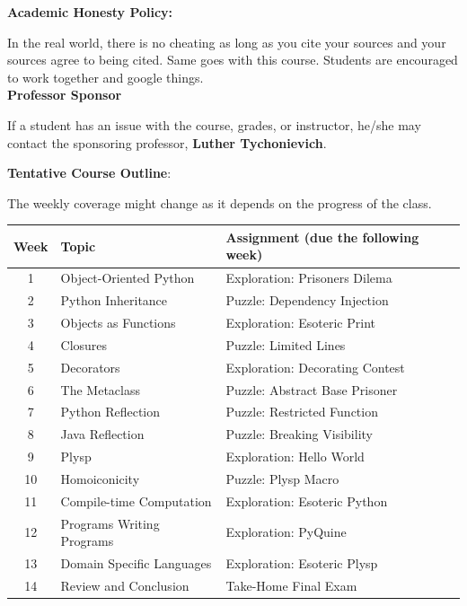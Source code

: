 \documentclass[11pt]{article}
\begin{document}
\textbf {\large Academic Honesty Policy:} 

In the real world, there is no cheating as long as you cite your sources and your sources agree to being cited. Same goes with this course. Students are encouraged to work together and google things. 
\\

\textbf {\large Professor Sponsor}

If a student has an issue with the course, grades, or instructor, he/she may contact the sponsoring professor, \textbf{Luther Tychonievich}.

\newpage
\textbf {\large Tentative Course Outline}:

The weekly coverage might change as it depends on the progress of the class. 

\begin{center}
\begin{tabular}{c | l | l}
\textbf{Week} & \textbf{Topic} & \textbf{Assignment} (due the following week)  \\
\hline 1 & Object-Oriented Python  & Exploration: Prisoners Dilema \\
2 & Python Inheritance & Puzzle: Dependency Injection \\
3 & Objects as Functions & Exploration: Esoteric Print  \\
4 & Closures & Puzzle: Limited Lines\\
5 & Decorators & Exploration: Decorating Contest\\
6 & The Metaclass &  Puzzle: Abstract Base Prisoner\\
7 & Python Reflection & Puzzle: Restricted Function \\
8 & Java Reflection & Puzzle: Breaking Visibility \\
9 & Plysp &  Exploration: Hello World\\
10 & Homoiconicity &  Puzzle: Plysp Macro\\
11 & Compile-time Computation & Exploration: Esoteric Python \\
12 & Programs Writing Programs & Exploration: PyQuine\\
13 & Domain Specific Languages &  Exploration: Esoteric Plysp\\
14 & Review and Conclusion & Take-Home Final Exam
\end{tabular}
\end{center}
\end{document}
